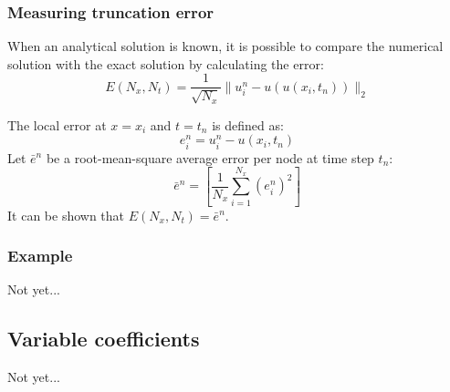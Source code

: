 \subsubsection{Measuring truncation error}
When an analytical solution is known, it is possible to compare the numerical solution with the exact solution by calculating the error:
\begin{equation}
	E(N_x, N_t) = \frac{1}{\sqrt{N_x}} \| u^{n}_i - u(u(x_i, t_n)) \|_2
\end{equation}

The local error at $x=x_i$ and $t=t_n$ is defined as:
\begin{equation}
	e^{n}_i = u^n_i - u(x_i, t_n)
\end{equation}
Let $\bar{e}^{n}$ be a root-mean-square average error per node at time step $t_n$:
\begin{equation}
	\bar{e}^{n} = \left[ \frac{1}{N_x} \sum_{i=1}^{N_x} \left( e^{n}_i \right)^2 \right]
\end{equation}
It can be shown that $E(N_x, N_t) = \bar{e}^{n}$.



\subsubsection{Example}
Not yet...



\subsection{Variable coefficients}
Not yet...














